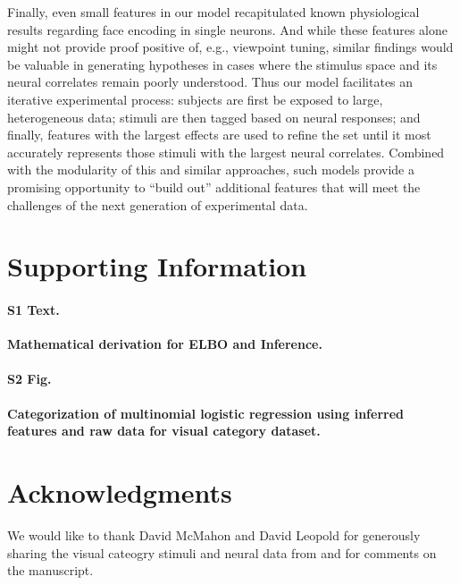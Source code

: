 \documentclass[12pt,a4paper]{article}
\begin{document}
Finally, even small features in our model recapitulated known physiological results regarding face encoding in single neurons. And while these features alone might not provide proof positive of, e.g., viewpoint tuning, similar findings would be valuable in generating hypotheses in cases where the stimulus space and its neural correlates remain poorly understood. Thus our model facilitates an iterative experimental process: subjects are first be exposed to large, heterogeneous data; stimuli are then tagged based on neural responses; and finally, features with the largest effects are used to refine the set until it most accurately represents those stimuli with the largest neural correlates. Combined with the modularity of this and similar approaches, such models provide a promising opportunity to ``build out'' additional features that will meet the challenges of the next generation of experimental data.




\section*{Supporting Information}

\paragraph*{S1 Text.}
\label{S1_Text}
{\bf Mathematical derivation for ELBO and Inference.}

 \paragraph*{S2 Fig.}
 \label{S2_Fig}
 {\bf Categorization of multinomial logistic regression using inferred features and raw data for visual category dataset.}

\section*{Acknowledgments}
We would like to thank David McMahon and David Leopold for generously sharing the visual cateogry stimuli and neural data from \cite{McMahon2014-qq} and for comments on the manuscript.

\nolinenumbers

%
%
%

{}
\end{document}
